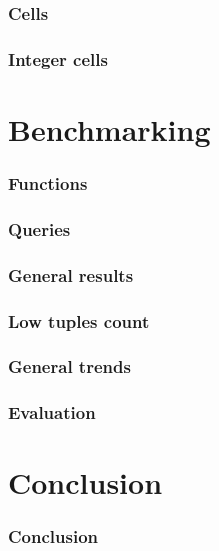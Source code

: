 \documentclass{beamer}
\begin{document}
\begin{frame}
\frametitle{Cells}
\end{frame}

\begin{frame}
\frametitle{Integer cells}
\end{frame}

\section{Benchmarking}
\begin{frame}
\frametitle{Functions}
\end{frame}
\begin{frame}
\frametitle{Queries}
\end{frame}

\begin{frame}
\frametitle{General results}
\end{frame}

\begin{frame}
\frametitle{Low tuples count}
\end{frame}

\begin{frame}
\frametitle{General trends}
\end{frame}

\begin{frame}
\frametitle{Evaluation}
\end{frame}

\section{Conclusion}
\begin{frame}
\frametitle{Conclusion}
\end{frame}
\end{document}
